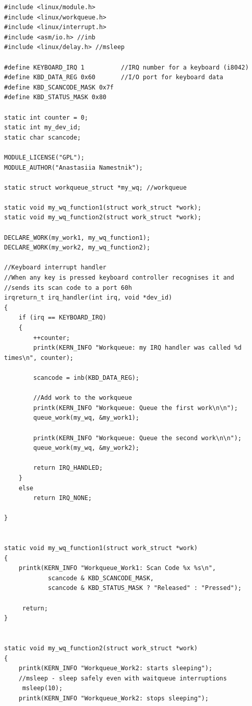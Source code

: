 \documentclass[12pt]{report}
\begin{document}
\begin{lstlisting}[label=some-code,caption=Код программы my\_workqueue.c]
#include <linux/module.h>
#include <linux/workqueue.h>
#include <linux/interrupt.h>
#include <asm/io.h> //inb
#include <linux/delay.h> //msleep

#define KEYBOARD_IRQ 1          //IRQ number for a keyboard (i8042)
#define KBD_DATA_REG 0x60       //I/O port for keyboard data 
#define KBD_SCANCODE_MASK 0x7f
#define KBD_STATUS_MASK 0x80

static int counter = 0;
static int my_dev_id;
static char scancode;

MODULE_LICENSE("GPL");
MODULE_AUTHOR("Anastasiia Namestnik");

static struct workqueue_struct *my_wq; //workqueue

static void my_wq_function1(struct work_struct *work);
static void my_wq_function2(struct work_struct *work);

DECLARE_WORK(my_work1, my_wq_function1);
DECLARE_WORK(my_work2, my_wq_function2);

//Keyboard interrupt handler
//When any key is pressed keyboard controller recognises it and 
//sends its scan code to a port 60h
irqreturn_t irq_handler(int irq, void *dev_id)
{
    if (irq == KEYBOARD_IRQ)
    {
       	++counter;
       	printk(KERN_INFO "Workqueue: my IRQ handler was called %d times\n", counter);

        scancode = inb(KBD_DATA_REG);

        //Add work to the workqueue
        printk(KERN_INFO "Workqueue: Queue the first work\n\n");
        queue_work(my_wq, &my_work1);
        
        printk(KERN_INFO "Workqueue: Queue the second work\n\n");
        queue_work(my_wq, &my_work2);

        return IRQ_HANDLED; 
    }
    else
        return IRQ_NONE; 

}


static void my_wq_function1(struct work_struct *work) 
{
	printk(KERN_INFO "Workqueue_Work1: Scan Code %x %s\n", 
     		scancode & KBD_SCANCODE_MASK,
      		scancode & KBD_STATUS_MASK ? "Released" : "Pressed");

	 return;
}


static void my_wq_function2(struct work_struct *work)
{
   	printk(KERN_INFO "Workqueue_Work2: starts sleeping");
   	//msleep - sleep safely even with waitqueue interruptions
  	 msleep(10);
   	printk(KERN_INFO "Workqueue_Work2: stops sleeping");


\end{lstlisting}
\end{document}
